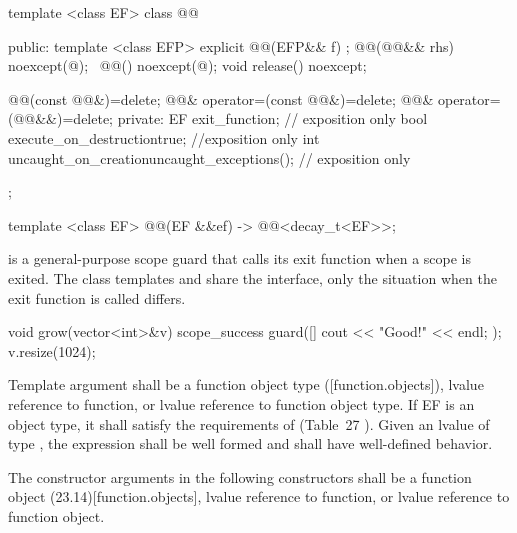 \documentclass[ebook,11pt,article]{memoir}
\begin{document}
\begin{codeblock}
template <class EF>
class @@ {
public:
  template <class EFP>
  explicit @@(EFP&& f) ;
  @@(@@&& rhs) noexcept(@\seebelow@);
  ~@@() noexcept(@\seebelow@);
  void release() noexcept;

  @@(const @@&)=delete;
  @@& operator=(const @@&)=delete;
  @@& operator=(@@&&)=delete;
private:
  EF exit_function;    // exposition only
  bool execute_on_destruction{true}; //exposition only
  int  uncaught_on_creation{uncaught_exceptions()}; // exposition only
};

template <class EF>
@@(EF &&ef) -> @@<decay_t<EF>>;

\end{codeblock}

\pnum
{} is a general-purpose scope guard that calls its exit function when a scope is exited. The class templates  and  share the  interface, only the situation when the exit function is called differs.\\
\begin{example}
\begin{codeblock}
void grow(vector<int>&v){
	scope_success guard([]{ cout << "Good!" << endl; });
	v.resize(1024);
}
\end{codeblock}
\end{example}


\pnum
\requires
Template argument  shall be a function object type ([function.objects]), 
lvalue reference to function, or 
lvalue reference to function object type.
If EF is an object type, it  shall satisfy
the requirements of  (Table~27
). 
Given an lvalue  of type , the expression  shall be well formed and shall have well-defined behavior.

\pnum
The constructor arguments  in the following constructors shall be a function object (23.14)[function.objects], 
lvalue reference to function, or 
lvalue reference to function object.
\end{document}
